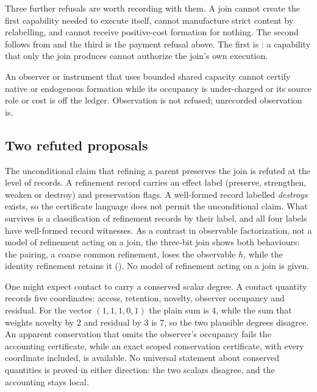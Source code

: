 Three further refusals are worth recording with them. A join cannot create the first
capability needed to execute itself, cannot manufacture strict content by relabelling, and
cannot receive positive-cost formation for nothing. The second follows from
 and the third is the payment refusal above. The first is
: a capability that only the join produces cannot authorize the
join's own execution.

An observer or instrument that uses bounded shared capacity cannot certify native or
endogenous formation while its occupancy is under-charged or its source role or cost is
off the ledger. Observation is not refused; unrecorded observation is.

\subsection{Two refuted proposals}

\begin{remark}
\label{rem:refinement-refuted}
The unconditional claim that refining a parent preserves the join is refuted at the
level of records. A refinement record carries an effect label (preserve, strengthen, weaken
or destroy) and preservation flags. A well-formed record labelled \emph{destroys} exists,
so the certificate language does not permit the unconditional claim. What survives is a
classification of refinement records by their label, and all four labels have well-formed record
witnesses. As a contrast in observable factorization, not a model of refinement acting on a join,
the three-bit join shows both behaviours: the pairing, a coarse common refinement, loses the
observable $h$, while the identity refinement retains it (). No model of refinement acting on a join is given.
\end{remark}

\begin{remark}
\label{rem:degree-refuted}
One might expect contact to carry a conserved scalar degree. A contact quantity records five
coordinates: access, retention, novelty, observer occupancy and residual. For the vector
$(1,1,1,0,1)$ the plain sum is $4$, while the sum that weights novelty by $2$ and residual by
$3$ is $7$, so the two plausible degrees disagree. An apparent conservation that
omits the observer's occupancy fails the accounting certificate, while an exact scoped
conservation certificate, with every coordinate included, is available. No universal
statement about conserved quantities is proved in either direction: the two scalars
disagree, and the accounting stays local.
\end{remark}

